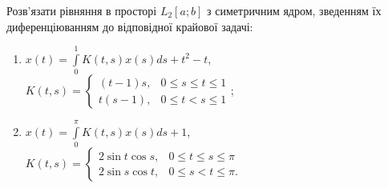 \begin{exercise}
    Розв'язати рівняння в просторі $L_2[a;b]$ з симетричним ядром, зведенням їх диференціюванням
    до відповідної крайової задачі:
    \begin{enumerate}
        \item $x(t) = \int\limits^1_0 K(t,s) x(s) ds + t^2 - t$,
        $K(t,s) = \begin{cases}
            (t-1)s, & 0 \leq s \leq t \leq 1 \\
            t(s-1), & 0 \leq t < s \leq 1
        \end{cases}$;
        \item $x(t) = \int\limits^\pi_0 K(t,s) x(s) ds + 1$,\
        $K(t,s) = \begin{cases}
            2 \sin t \cos s, & 0 \leq t \leq s \leq \pi \\
            2 \sin s \cos t, & 0 \leq s < t \leq \pi .
        \end{cases}$
    \end{enumerate}
\end{exercise}